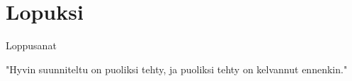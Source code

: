 \documentclass{beamer}
\begin{document}
\section{Lopuksi}

\begin{frame}{Loppusanat}

	\begin{displayquote}
		"Hyvin suunniteltu on puoliksi tehty, ja puoliksi tehty on kelvannut ennenkin."
	\end{displayquote}

\end{frame}


\begin{frame}

\end{frame}
\end{document}
